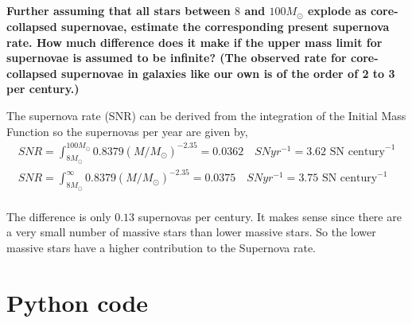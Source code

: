 \subsection{}
\textbf{Further assuming that all stars between $8$ and $100M_\odot$ explode as core-collapsed supernovae, estimate the corresponding present supernova rate. 
How much difference does it make if the upper mass limit for supernovae is assumed to be infinite? (The observed rate for
core-collapsed supernovae in galaxies like our own is of the order of 2 to 3 per century.)}

The supernova rate (SNR) can be derived from the integration of the Initial Mass Function so the supernovas per year are given by,
\begin{align*}
    SNR = \int_{8M_\odot}^{100M_\odot}0.8379(M/M_\odot)^{-2.35} = 0.0362\quad SN yr^{-1} = 3.62 \text{ SN century}^{-1}\\
    SNR = \int_{8M_\odot}^{\infty}0.8379(M/M_\odot)^{-2.35} = 0.0375\quad SN yr^{-1} = 3.75 \text{ SN century}^{-1}\\
\end{align*}

The difference is only $0.13$ supernovas per century. It makes sense since there are a very small number of massive stars than lower massive stars. So the lower massive stars have a higher contribution to the Supernova rate. 

\appendix
\newpage

\section[]{Python code} 


